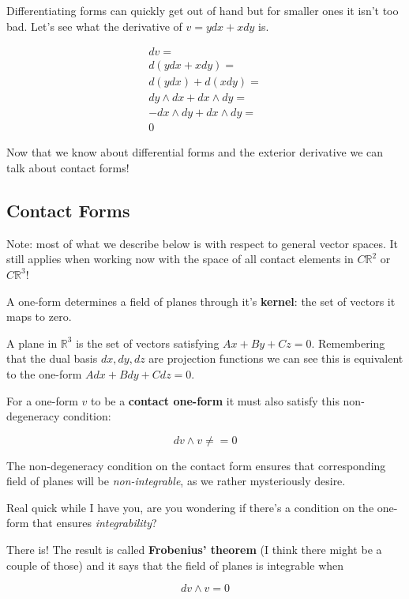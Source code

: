 \documentclass{article}
\begin{document}
Differentiating forms can quickly get out of hand but for smaller ones it isn't
too bad. Let's see what the derivative of $v = ydx + xdy$ is.

\begin{align*}
  dv = \\
  d(ydx + xdy) = \\
  d(ydx) + d(xdy) = \\
  dy \wedge dx + dx \wedge dy = \\
  -dx \wedge dy + dx \wedge dy = \\
  0
\end{align*}

Now that we know about differential forms and the exterior derivative we can
talk about contact forms!

\subsection {Contact Forms}

Note: most of what we describe below is with respect to general vector spaces.
It still applies when working now with the space of all contact elements in $C\mathbb{R}^{2}$ or
$C\mathbb{R}^{3}$! 

A one-form determines a field of planes through it's \textbf{kernel}: the set of
vectors it maps to zero.

A plane in $\mathbb{R}^{3}$ is the set of vectors satisfying $Ax + By + Cz = 0$.
Remembering that the dual basis $dx, dy, dz$ are projection functions we can see
this is equivalent to the one-form $Adx + Bdy + Cdz = 0$.

For a one-form $v$ to be a \textbf{contact one-form} it must also satisfy this
non-degeneracy condition:

\begin{equation}
  dv \wedge v \neq = 0
\end{equation}

The non-degeneracy condition on the contact form ensures that corresponding
field of planes will be \textit{non-integrable}, as we rather mysteriously
desire.

Real quick while I have you, are you wondering if there's a condition on the
one-form that ensures \textit{integrability}?

There is! The result is called \textbf{Frobenius' theorem} (I think there might
be a couple of those) and it says that the field of planes is integrable when

\begin{equation}
  dv \wedge v = 0
\end{equation}
\end{document}
